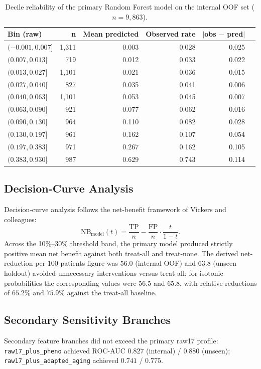 \documentclass[11pt,a4paper]{article}
\begin{document}
\begin{table}[h!]
\centering
\small
\caption{Decile reliability of the primary Random Forest model on the internal OOF set
($n=9{,}863$).}
\label{tab:reliability-oof}
\begin{tabular}{lrrrrr}
\toprule
Bin (raw) & n & Mean predicted & Observed rate & $|$obs $-$ pred$|$ \\
\midrule
$(-0.001, 0.007]$ & 1{,}311 & 0.003 & 0.028 & 0.025 \\
$(0.007, 0.013]$  &   719   & 0.012 & 0.033 & 0.022 \\
$(0.013, 0.027]$  & 1{,}101 & 0.021 & 0.036 & 0.015 \\
$(0.027, 0.040]$  &   827   & 0.035 & 0.041 & 0.006 \\
$(0.040, 0.063]$  & 1{,}101 & 0.053 & 0.045 & 0.007 \\
$(0.063, 0.090]$  &   921   & 0.077 & 0.062 & 0.016 \\
$(0.090, 0.130]$  &   964   & 0.110 & 0.082 & 0.028 \\
$(0.130, 0.197]$  &   961   & 0.162 & 0.107 & 0.054 \\
$(0.197, 0.383]$  &   971   & 0.267 & 0.162 & 0.105 \\
$(0.383, 0.930]$  &   987   & 0.629 & 0.743 & 0.114 \\
\bottomrule
\end{tabular}
\end{table}

\subsection{Decision-Curve Analysis}
Decision-curve analysis follows the net-benefit framework of Vickers and
colleagues\cite{Vickers2006,Vickers2016}:
\[
\mathrm{NB}_{\text{model}}(t) = \frac{\mathrm{TP}}{n} -
\frac{\mathrm{FP}}{n} \cdot \frac{t}{1-t}.
\]
Across the 10\%--30\% threshold band, the primary model produced strictly positive mean net benefit
against both treat-all and treat-none. The derived net-reduction-per-100-patients
figure\cite{Vickers2016} was $56.0$ (internal OOF) and $63.8$ (unseen holdout) avoided unnecessary
interventions versus treat-all; for isotonic probabilities the corresponding values were $56.5$ and
$65.8$, with relative reductions of $65.2\%$ and $75.9\%$ against the treat-all baseline.

\subsection{Secondary Sensitivity Branches}
Secondary feature branches did not exceed the primary raw17 profile: \texttt{raw17\_plus\_pheno}
achieved ROC-AUC $0.827$ (internal) / $0.880$ (unseen); \texttt{raw17\_plus\_adapted\_aging}
achieved $0.741$ / $0.775$.
\end{document}
